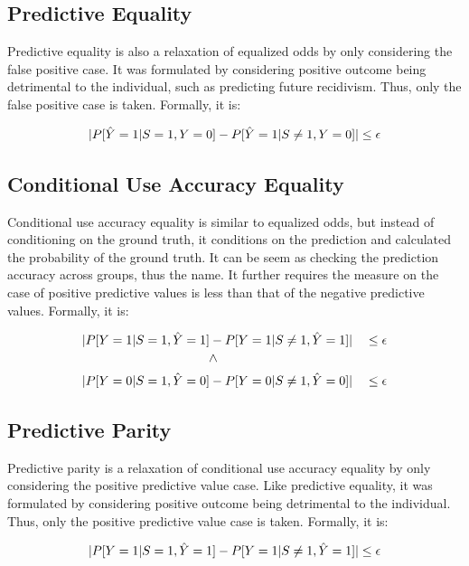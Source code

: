 \documentclass[conference]{IEEEtran}
\begin{document}
\subsection{Predictive Equality}
Predictive equality \cite{corbett2017algorithmic} is also a relaxation of equalized odds by only considering the false positive case. It was formulated by considering positive outcome being detrimental to the individual, such as predicting future recidivism. Thus, only the false positive case is taken. Formally, it is:

\begin{align*}
    \lvert P[\hat{Y} = 1 | S = 1, Y = 0] - P[\hat{Y} = 1 | S \neq 1, Y = 0]\rvert \leq \epsilon
\end{align*}

\subsection{Conditional Use Accuracy Equality}
Conditional use accuracy equality \cite{berk2021fairness} is similar to equalized odds, but instead of conditioning on the ground truth, it conditions on the prediction and calculated the probability of the ground truth. It can be seem as checking the prediction accuracy across groups, thus the name. It further requires the measure on the case of positive predictive values is less than that of the negative predictive values. Formally, it is:

\begin{align*}
    \abs{P[Y = 1 | S = 1, \hat{Y} = 1] & - P[Y = 1 | S \neq 1, \hat{Y} = 1]} && \leq \epsilon \\
    & \rotatebox{90}{>} && \\
    \abs{P[Y = 0 | S = 1, \hat{Y} = 0] & - P[Y = 0 | S \neq 1, \hat{Y} = 0]} && \leq \epsilon
\end{align*}

\subsection{Predictive Parity}
Predictive parity \cite{chouldechova2017fair} is a relaxation of conditional use accuracy equality by only considering the positive predictive value case. Like predictive equality, it was formulated by considering positive outcome being detrimental to the individual. Thus, only the positive predictive value case is taken. Formally, it is:

\begin{align*}
    \lvert P[Y = 1 | S = 1, \hat{Y} = 1] - P[Y = 1 | S \neq 1, \hat{Y} = 1]\rvert \leq \epsilon
\end{align*}
\end{document}
